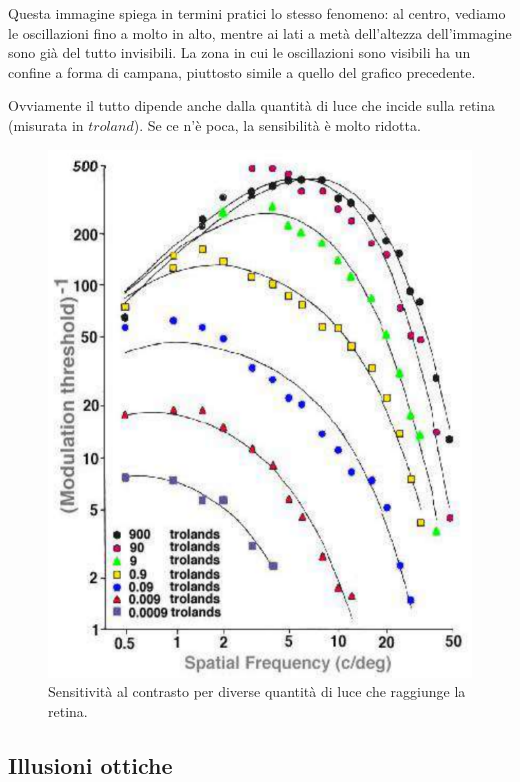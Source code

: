 \documentclass[a4paper,11pt]{article}
\begin{document}
Questa immagine spiega in termini pratici lo stesso fenomeno: al centro, vediamo le oscillazioni fino a molto in alto, mentre ai lati a metà dell'altezza dell'immagine
sono già del tutto invisibili. La zona in cui le oscillazioni sono visibili ha un confine a forma di campana, piuttosto simile a quello del grafico precedente.
\par
Ovviamente il tutto dipende anche dalla quantità di luce che incide sulla retina (misurata in $troland$). Se ce n'è poca, la sensibilità è molto ridotta.

\renewcommand{\thefigure}{2.15}
\begin{figure}[!h]
  \centering
    \includegraphics[scale=0.4]{images/2/spatial_freq_trolands.png}
    \caption{Sensitività al contrasto per diverse quantità di luce che raggiunge la retina.}
\end{figure}

\newpage

\subsection{Illusioni ottiche}
\end{document}
